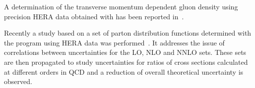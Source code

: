 A determination of the transverse momentum dependent gluon density using precision HERA
data obtained with \fitter has been reported in~\cite{Jung2014}. 

Recently a study based on a set of parton distribution functions 
determined with the \fitter program using HERA data was performed~\cite{hfcorrpaper}.
It addresses the issue of correlations between uncertainties for the LO,
NLO and NNLO sets. These sets are then propagated to study uncertainties 
for ratios of cross sections calculated at different orders in QCD and  
a reduction of overall theoretical uncertainty is observed.

